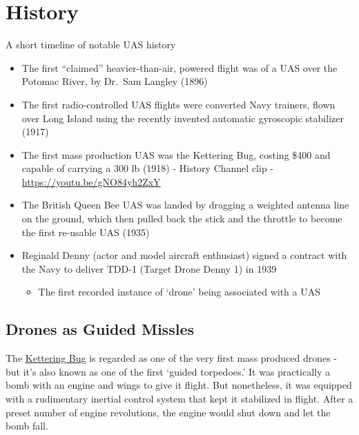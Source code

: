 \documentclass[
]{book}
\providecommand{\tightlist}{%
  \setlength{\itemsep}{0pt}\setlength{\parskip}{0pt}}
\theoremstyle{definition}
\theoremstyle{definition}
\theoremstyle{definition}
\theoremstyle{definition}
\theoremstyle{remark}
\begin{document}
\hypertarget{history}{%
\section{History}\label{history}}

A short timeline of notable UAS history

\begin{itemize}
\tightlist
\item
  The first ``claimed'' heavier-than-air, powered flight was of a UAS over the Potomac River, by Dr.~Sam Langley (1896)
\item
  The first radio-controlled UAS flights were converted Navy trainers, flown over Long Island using the recently invented automatic gyroscopic stabilizer (1917)
\item
  The first mass production UAS was the Kettering Bug, costing \$400 and capable of carrying a 300 lb (1918) - History Channel clip - \url{https://youtu.be/gNO84yh2ZxY}
\item
  The British Queen Bee UAS was landed by dragging a weighted antenna line on the ground, which then pulled back the stick and the throttle to become the first re-usable UAS (1935)
\item
  Reginald Denny (actor and model aircraft enthusiast) signed a contract with the Navy to deliver TDD-1 (Target Drone Denny 1) in 1939

  \begin{itemize}
  \tightlist
  \item
    The first recorded instance of `drone' being associated with a UAS
  \end{itemize}
\end{itemize}

\hypertarget{drones-as-guided-missles}{%
\subsection{Drones as Guided Missles}\label{drones-as-guided-missles}}

The \href{https://en.wikipedia.org/wiki/Kettering_Bug}{Kettering Bug} is regarded as one of the very first mass produced drones - but it's also known as one of the first `guided torpedoes.' It was practically a bomb with an engine and wings to give it flight. But nonetheless, it was equipped with a rudimentary inertial control system that kept it stabilized in flight. After a preset number of engine revolutions, the engine would shut down and let the bomb fall.
\end{document}
